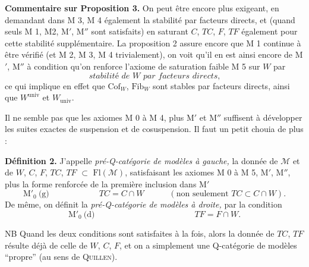 \documentclass[11pt]{article}
\newcommand{\printedpage}[1]{\marginpar{\footnotesize p.~#1}}
\newcommand{\msp}[1]{\marginpar{\footnotesize [#1]}}
\newcommand{\Fl}{\mathrm{Fl}}
\newcommand{\cM}{\mathcal{M}}
\newcommand{\Cof}{\mathrm{Cof}}
\newcommand{\Fib}{\mathrm{Fib}}
\begin{document}
\textbf{Commentaire sur Proposition 3.} On peut être encore plus exigeant, en demandant dans M 3, M 4 également la stabilité par facteurs directs, et (quand seuls M 1, M2, M$'$, M$''$ %
sont satisfaits) en saturant $C$, $TC$, $F$, $TF$ également pour cette stabilité supplémentaire. La proposition 2 assure encore que M 1 continue à être vérifié (et M 2, M 3, M 4 trivialement), on voit qu'il en est ainsi encore de M$'$, M$''$ à condition qu'on renforce l'axiome de saturation faible M 5 sur $W$ par
\[
\textit{stabilité de $W$ par facteurs directs,}
\]
ce qui implique en effet que $\Cof_W$, $\Fib_W$ sont stables par facteurs directs, ainsi que $W^{\mathrm{univ}}$ et $W_{\mathrm{univ}}$.

\msp{page 12}Il ne semble pas que les axiomes M 0 à M 4, plus M$'$ et M$''$ suffisent à développer les suites exactes de suspension et de cosuspension. Il faut un petit chouia de plus :

\printedpage{8}
\textbf{Définition 2.} J'appelle \textit{pré-Q-catégorie de modèles à gauche,} la donnée de $\cM$ et de $W$, $C$, $F$, $TC$, $TF$ $\subset$ $\Fl(\cM)$, satisfaisant les axiomes M 0 à M 5, M$'$, M$''$, plus la forme renforcée de la première inclusion dans M$'$
\[
\text{M}'_0\ \text{(g)}\qquad\qquad\qquad TC=C\cap W\qquad\quad(\text{non seulement } TC\subset C\cap W).
\]
De même, on définit la \textit{pré-Q-catégorie de modèles à droite,} par la condition
\[
\text{M}'_0\ \text{(d)}\qquad\qquad\qquad\qquad\qquad\qquad TF=F\cap W.
\]

NB Quand les deux conditions sont satisfaites à la fois, alors la donnée de $TC$, $TF$ résulte déjà de celle de $W$, $C$, $F$, et on a simplement une Q-catégorie de modèles “propre” (au sens de \textsc{Quillen}).
\end{document}
